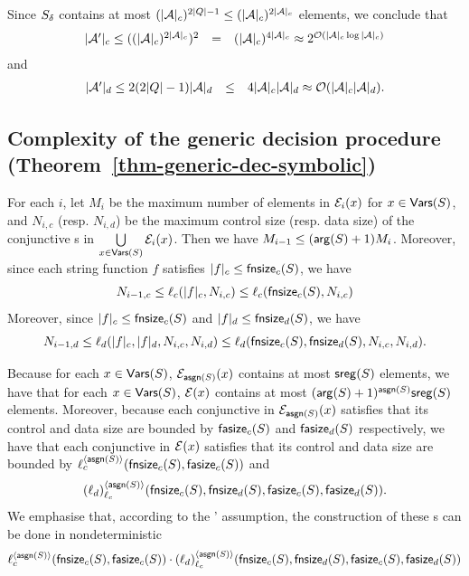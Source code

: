 Since $S_{\delta}$ contains at most $(|\mathcal{A}|_c)^{2 |Q|-1} \le (|\mathcal{A}|_c)^{2 |\mathcal{A}|_c}$ elements, we conclude that 
$$
\begin{array}{l c l}
|\mathcal{A}'|_c \le ((|\mathcal{A}|_c)^{2|\mathcal{A}|_c})^2  & = & (|\mathcal{A}|_c)^{4|\mathcal{A}|_c} 
 \approx    2^{\mathcal{O}\left(|\mathcal{A}|_c \log |\mathcal{A}|_c\right)}
\end{array}
$$ 
and 
$$
\begin{array}{l c l}
|\mathcal{A}'|_d \le 2(2|Q|-1) |\mathcal{A}|_d & \le & 4 |\mathcal{A}|_c |\mathcal{A}|_d 
\approx   \mathcal{O}( |\mathcal{A}|_c |\mathcal{A}|_d).
\end{array}
$$





\subsection{Complexity of the generic decision procedure (Theorem~\ref{thm-generic-dec-symbolic})}

For each $i$, 
let $M_i$ be the maximum number of elements in $\mathcal{E}_i(x)$ for $x  \in \mathsf{Vars}(S)$,
and $N_{i,c}$ (resp. $N_{i, d}$) be the maximum control size (resp. data size) of the conjunctive \SA{}s in $\bigcup \limits_{x \in \mathsf{Vars}(S)} \mathcal{E}_i(x)$.
Then we have $M_{i-1} \le (\mathsf{arg}(S)+1)M_i $. Moreover, since each string function $f$ satisfies  $|f|_c \le \mathsf{fnsize}_c(S)$, we have 
%
$$N_{i-1, c} \le \ell_c(|f|_c, N_{i, c}) \le \ell_c(\mathsf{fnsize}_c(S), N_{i,c})$$ 
%
Moreover, since $|f|_c \le \mathsf{fnsize}_c(S)$ and $|f|_d \le \mathsf{fnsize}_d(S)$, we have
%
$$N_{i-1, d} \le \ell_d(|f|_c, |f|_d, N_{i, c}, N_{i,d}) \le \ell_d(\mathsf{fnsize}_c(S), \mathsf{fnsize}_d(S), N_{i, c}, N_{i,d}).$$ 

Because for each $x \in \mathsf{Vars}(S)$, $\mathcal{E}_{\mathsf{asgn}(S)}(x)$ contains at most $\mathsf{sreg}(S)$ elements, we have that for each $x \in \mathsf{Vars}(S)$, $\mathcal{E}(x)$ contains at most $(\mathsf{arg}(S)+1)^{\mathsf{asgn}(S)}\mathsf{sreg}(S)$ elements. 
Moreover, because each conjunctive \SA{} in $\mathcal{E}_{\mathsf{asgn}(S)}(x)$ satisfies that its control and data size are bounded by $\mathsf{fasize}_c(S)$ and $\mathsf{fasize}_d(S)$ respectively, 
we have that each conjunctive \SA{} in $\mathcal{E}(x)$ satisfies that its control and data size are bounded by $\ell_c^{\langle \mathsf{asgn}(S) \rangle}(\mathsf{fnsize}_c(S), \mathsf{fasize}_c(S))$ and 
%
\[ (\ell_d)^{\langle  \mathsf{asgn}(S) \rangle}_{\ell_c}(\mathsf{fnsize}_c(S), \mathsf{fnsize}_d(S), \mathsf{fasize}_c(S), \mathsf{fasize}_d(S)).\]
% 
We emphasise that, according to the \prerec{}' assumption, the construction of these \SA{}s can be done in nondeterministic 
%
{
\small
$$\ell_c^{\langle  \mathsf{asgn}(S) \rangle}(\mathsf{fnsize}_c(S), \mathsf{fasize}_c(S)) \cdot (\ell_d)^{\langle \mathsf{asgn}(S) \rangle}_{\ell_c}(\mathsf{fnsize}_c(S),  \mathsf{fnsize}_d(S), \mathsf{fasize}_c(S), \mathsf{fasize}_d(S))$$
}

